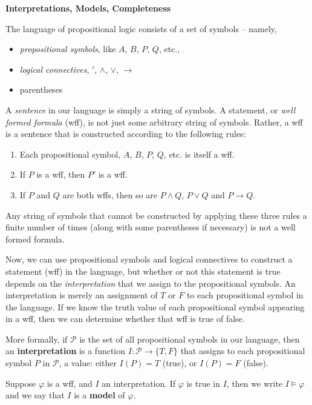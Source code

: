 \documentclass[12pt]{amsart}
\newcommand{\meet}{\ensuremath{\wedge}}
\newcommand{\join}{\ensuremath{\vee}}
\newcommand{\sP}{\ensuremath{\mathcal{P}}}
\renewcommand{\phi}{\ensuremath{\varphi}}
\begin{document}
\thispagestyle{empty}

\begin{center} \textbf{Interpretations, Models, Completeness}\\ \end{center}
The language of propositional logic consists of a set of symbols -- namely,
\begin{itemize}
\item 
 \emph{propositional symbols}, like $A$, $B$, $P$, $Q$, etc.,
\item \emph{logical connectives}, $'$, $\meet$, $\join$, $\rightarrow$
\item parentheses
\end{itemize}
A \emph{sentence} in our language is simply a string of symbols.
A statement, or \emph{well formed formula} (wff), is not just some arbitrary string of
symbols. Rather, a wff is a sentence that is constructed 
according to the following rules:
\begin{enumerate}
\item Each propositional symbol, $A$, $B$, $P$, $Q$, etc. is itself a wff.
\item If $P$ is a wff, then $P'$ is a wff.
\item If $P$ and $Q$ are both wffs, then so are $P\meet Q$, $P\join Q$ and
  $P\rightarrow Q$.
\end{enumerate}
Any string of symbols that cannot be constructed by applying
these three rules a finite number of times (along with some parentheses if necessary) 
is not a well formed formula.

Now, we can use propositional symbols and logical connectives to construct a
statement (wff) in the language, but whether or not this statement is true
depends on the \emph{interpretation} that we assign to the propositional symbols.  An
interpretation is merely an assignment of $T$ or $F$ to each propositional symbol in
the language.  If we know the truth value of each propositional symbol appearing
in a wff, then we can determine whether that wff is true of false.   


More formally, if $\sP$ is the set of all propositional
symbols in our language, then an {\bf interpretation} is a function $I : \sP
\rightarrow \{T, F\}$ that assigns to each propositional symbol $P$ in $\sP$, a
value: either $I(P) = T$ (true), or $I(P) = F$ (false).

Suppose $\phi$ is a wff, and $I$ an interpretation.  If $\phi$ is true in $I$,
then we write $I\models \phi$ and we say that $I$ is a {\bf model} of $\phi$.
\end{document}
